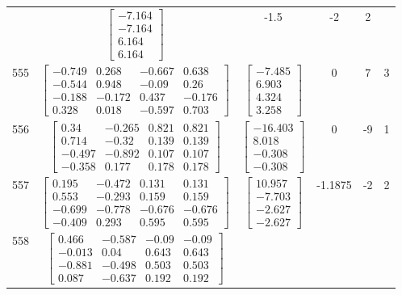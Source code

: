 \documentclass[a4paper,12pt]{article}
\begin{document}
\begin{tabular}{c c c c c c}
&
$\begin{bmatrix} -7.164 \\ -7.164 \\ 6.164 \\ 6.164 \end{bmatrix}$
&
-1.5
&
-2
&
2
\\
555
&
$\begin{bmatrix} -0.749 & 0.268 & -0.667 & 0.638 \\ -0.544 & 0.948 & -0.09 & 0.26 \\ -0.188 & -0.172 & 0.437 & -0.176 \\ 0.328 & 0.018 & -0.597 & 0.703 \end{bmatrix}$
&
$\begin{bmatrix} -7.485 \\ 6.903 \\ 4.324 \\ 3.258 \end{bmatrix}$
&
0
&
7
&
3
\\
556
&
$\begin{bmatrix} 0.34 & -0.265 & 0.821 & 0.821 \\ 0.714 & -0.32 & 0.139 & 0.139 \\ -0.497 & -0.892 & 0.107 & 0.107 \\ -0.358 & 0.177 & 0.178 & 0.178 \end{bmatrix}$
&
$\begin{bmatrix} -16.403 \\ 8.018 \\ -0.308 \\ -0.308 \end{bmatrix}$
&
0
&
-9
&
1
\\
557
&
$\begin{bmatrix} 0.195 & -0.472 & 0.131 & 0.131 \\ 0.553 & -0.293 & 0.159 & 0.159 \\ -0.699 & -0.778 & -0.676 & -0.676 \\ -0.409 & 0.293 & 0.595 & 0.595 \end{bmatrix}$
&
$\begin{bmatrix} 10.957 \\ -7.703 \\ -2.627 \\ -2.627 \end{bmatrix}$
&
-1.1875
&
-2
&
2
\\
558
&
$\begin{bmatrix} 0.466 & -0.587 & -0.09 & -0.09 \\ -0.013 & 0.04 & 0.643 & 0.643 \\ -0.881 & -0.498 & 0.503 & 0.503 \\ 0.087 & -0.637 & 0.192 & 0.192 \end{bmatrix}$

\end{tabular}
\end{document}
